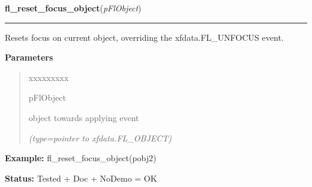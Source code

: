 \hspace{.8\funcindent}\begin{boxedminipage}{\funcwidth}

    \raggedright \textbf{fl\_reset\_focus\_object}(\textit{pFlObject})

    \vspace{-1.5ex}

    \rule{\textwidth}{0.5\fboxrule}
\setlength{\parskip}{2ex}
    Resets focus on current object, overriding the xfdata.FL\_UNFOCUS 
    event.

\setlength{\parskip}{1ex}
      \textbf{Parameters}
      \vspace{-1ex}

      \begin{quote}
        \begin{Ventry}{xxxxxxxxx}

          \item[pFlObject]

          object towards applying event

            {\it (type=pointer to xfdata.FL\_OBJECT)}

        \end{Ventry}

      \end{quote}

\textbf{Example:} fl\_reset\_focus\_object(pobj2)



\textbf{Status:} Tested + Doc + NoDemo = OK



    \end{boxedminipage}

    \label{xformslib:flbasic:fl_set_form_atclose}

    \vspace{0.5ex}

